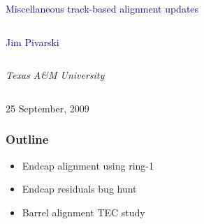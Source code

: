 \documentclass[compress]{beamer}
\begin{document}
\begin{frame}
\vfill
\begin{center}
\textcolor{darkblue}{\Large Miscellaneous track-based alignment updates}

\vfill
\begin{columns}
\begin{center}
\large
\textcolor{darkblue}{Jim Pivarski}
\end{center}
\end{columns}

\begin{columns}
\begin{center}
\scriptsize
{\it Texas A\&M University}
\end{center}
\end{columns}

\vfill
25 September, 2009

\end{center}
\end{frame}


\small

\begin{frame}
\frametitle{Outline}
\begin{itemize}\setlength{\itemsep}{0.75 cm}
\item Endcap alignment using ring-1
\item Endcap residuals bug hunt
\item Barrel alignment TEC study
\end{itemize}
\end{frame}

\end{document}
